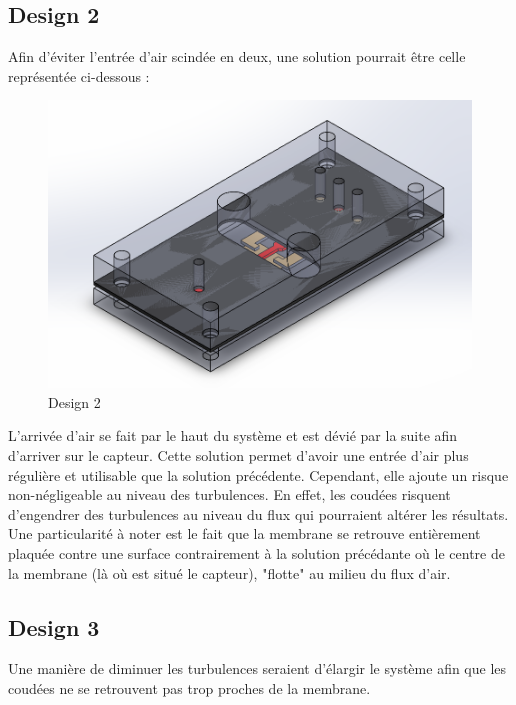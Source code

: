 \subsection{Design 2}
Afin d'éviter l'entrée d'air scindée en deux, une solution pourrait être celle représentée ci-dessous :
\begin{figure}[H]
    \centering
    \includegraphics[scale = 0.3]{images/Capteur_design2_caoutch.png}
    \caption{Design 2}
    \label{fig:design2}
\end{figure}
L'arrivée d'air se fait par le haut du système et est dévié par la suite afin d'arriver sur le capteur. Cette solution permet d'avoir une
entrée d'air plus régulière et utilisable que la solution précédente. Cependant, elle ajoute un risque non-négligeable au niveau des turbulences. En effet,
les coudées risquent d'engendrer des turbulences au niveau du flux qui pourraient altérer les résultats.\\
Une particularité à noter est le fait que la membrane se retrouve entièrement plaquée contre une surface contrairement à la solution
précédante où le centre de la membrane (là où est situé le capteur), "flotte" au milieu du flux d'air.

\subsection{Design 3}
Une manière de diminuer les turbulences seraient d'élargir le système afin que les coudées ne se retrouvent pas trop proches de la
membrane.

